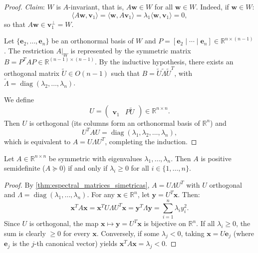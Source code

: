 \begin{proof}
	\textit{Claim}: $W$ is $A$-invariant, that is, $A\mathbf{w} \in W$ for all $\mathbf{w} \in W$. Indeed, if $\mathbf{w} \in W$:
	\[
		\langle A\mathbf{w}, \mathbf{v}_1 \rangle = \langle \mathbf{w}, A\mathbf{v}_1 \rangle = \lambda_1 \langle \mathbf{w}, \mathbf{v}_1 \rangle = 0,
	\]
	so that $A\mathbf{w} \in \mathbf{v}_1^\perp = W$.

	Let $\{\mathbf{e}_2, \ldots, \mathbf{e}_n\}$ be an orthonormal basis of $W$ and $P = [\mathbf{e}_2 \mid \cdots \mid \mathbf{e}_n] \in \mathbb{R}^{n \times (n-1)}$. The restriction $A|_W$ is represented by the symmetric matrix $B = P^T A P \in \mathbb{R}^{(n-1) \times (n-1)}$. By the inductive hypothesis, there exists an orthogonal matrix $\tilde{U} \in O(n-1)$ such that $B = \tilde{U} \tilde{\Lambda} \tilde{U}^T$, with $\tilde{\Lambda} = \operatorname{diag}(\lambda_2, \ldots, \lambda_n)$.

	We define
	\[
		U = \begin{pmatrix} \mathbf{v}_1 & P\tilde{U} \end{pmatrix} \in \mathbb{R}^{n \times n}.
	\]
	Then $U$ is orthogonal (its columns form an orthonormal basis of $\mathbb{R}^n$) and
	\[
		U^T A U = \operatorname{diag}(\lambda_1, \lambda_2, \ldots, \lambda_n),
	\]
	which is equivalent to $A = U \Lambda U^T$, completing the induction.
\end{proof}

\begin{corollary}\label{cor:caracterizacion_semidefinida}
	Let $A \in \mathbb{R}^{n \times n}$ be symmetric with eigenvalues $\lambda_1, \ldots, \lambda_n$. Then $A$ is positive semidefinite ($A \succeq 0$) if and only if $\lambda_i \geq 0$ for all $i \in \{1, \ldots, n\}$.
\end{corollary}

\begin{proof}
	By \autoref{thm:espectral_matrices_simetricas}, $A = U \Lambda U^T$ with $U$ orthogonal and $\Lambda = \operatorname{diag}(\lambda_1, \ldots, \lambda_n)$. For any $\mathbf{x} \in \mathbb{R}^n$, let $\mathbf{y} = U^T \mathbf{x}$. Then:
	\[
		\mathbf{x}^T A \mathbf{x} = \mathbf{x}^T U \Lambda U^T \mathbf{x} = \mathbf{y}^T \Lambda \mathbf{y} = \sum_{i=1}^n \lambda_i y_i^2.
	\]
	Since $U$ is orthogonal, the map $\mathbf{x} \mapsto \mathbf{y} = U^T \mathbf{x}$ is bijective on $\mathbb{R}^n$. If all $\lambda_i \geq 0$, the sum is clearly $\geq 0$ for every $\mathbf{x}$. Conversely, if some $\lambda_j < 0$, taking $\mathbf{x} = U\mathbf{e}_j$ (where $\mathbf{e}_j$ is the $j$-th canonical vector) yields $\mathbf{x}^T A \mathbf{x} = \lambda_j < 0$.
\end{proof}

